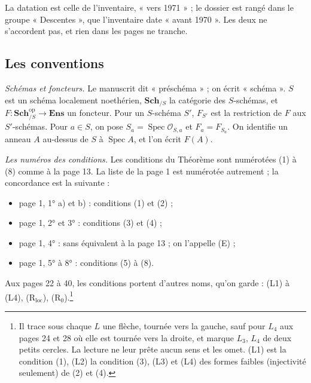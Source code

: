 \documentclass[11pt,a4paper]{article}
\begin{document}
La datation est celle de l'inventaire, « vers 1971 » ; le dossier est rangé
dans le groupe « Descentes », que l'inventaire date « avant 1970 ». Les deux
ne s'accordent pas, et rien dans les pages ne tranche.

\subsection*{Les conventions}

\emph{Schémas et foncteurs.} Le manuscrit dit « préschéma » ; on écrit
« schéma ». $S$ est un schéma localement noethérien, $\mathbf{Sch}_{/S}$ la
catégorie des $S$-schémas, et $F : \mathbf{Sch}_{/S}^{\mathrm{op}} \to
\mathbf{Ens}$ un foncteur. Pour un $S$-schéma $S'$, $F_{S'}$ est la
restriction de $F$ aux $S'$-schémas. Pour $a \in S$, on pose $S_a =
\operatorname{Spec} \mathcal{O}_{S,a}$ et $F_a = F_{S_a}$. On identifie un
anneau $A$ au-dessus de $S$ à $\operatorname{Spec} A$, et l'on écrit $F(A)$.

\emph{Les numéros des conditions.} Les conditions du Théorème sont numérotées
(1) à (8) comme à la page 13. La liste de la page 1 est numérotée autrement ;
la concordance est la suivante :
\begin{itemize}
\item page 1, 1° a) et b) : conditions (1) et (2) ;
\item page 1, 2° et 3° : conditions (3) et (4) ;
\item page 1, 4° : sans équivalent à la page 13 ; on l'appelle (E) ;
\item page 1, 5° à 8° : conditions (5) à (8).
\end{itemize}
Aux pages 22 à 40, les conditions portent d'autres noms, qu'on garde :
(L1) à (L4), (R$_{\mathrm{loc}}$), (R$_0$).\footnote{Il trace sous chaque
$L$ une flèche, tournée vers la gauche, sauf pour $L_4$ aux pages 24 et 28 où
elle est tournée vers la droite, et marque $L_3$, $L_4$ de deux petits
cercles. La lecture ne leur prête aucun sens et les omet. (L1) est la
condition (1), (L2) la condition (3), (L3) et (L4) des formes faibles
(injectivité seulement) de (2) et (4).}
\end{document}
